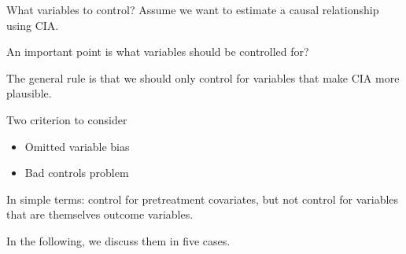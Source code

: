 \documentclass[handout]{beamer}
\begin{document}
\begin{frame}{What variables to control?}
Assume we want to estimate a causal relationship using CIA.\bigskip

An important point is what variables should be controlled for?\bigskip

The general rule is that we should only control for variables that make CIA more plausible.\bigskip

Two criterion to consider
\begin{itemize}
\item Omitted variable bias
\item Bad controls problem
\end{itemize}\medskip

In simple terms: control for pretreatment covariates, but not control for variables that are themselves outcome variables.\medskip

In the following, we discuss them in five cases.
\end{frame}
\end{document}
